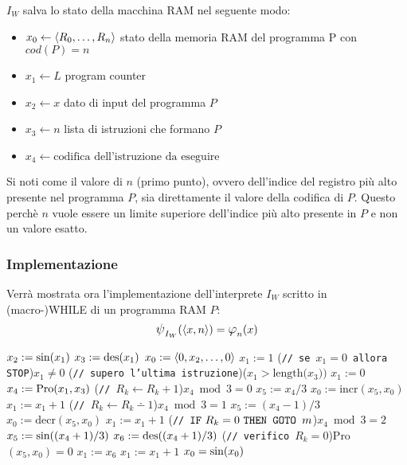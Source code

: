 $I_W$ salva lo stato della macchina RAM nel seguente modo:
\begin{itemize}
    \item $x_0 \leftarrow \langle R_0,\dots,R_{n}\rangle$\hfill
        stato della memoria RAM del programma P con $cod(P)=n$
    \item $x_1 \leftarrow L$ \hfill program counter
    \item $x_2 \leftarrow x$ \hfill dato di input del programma $P$
    \item $x_3 \leftarrow n$ \hfill lista di istruzioni che formano $P$
    \item $x_4 \leftarrow \text{codifica dell'istruzione da eseguire}$
\end{itemize}

Si noti come il valore di $n$ (primo punto), ovvero dell'indice del registro più alto 
presente nel programma $P$, sia direttamente il valore della codifica di $P$. Questo
perchè $n$ vuole essere un limite superiore dell'indice più alto presente in $P$ e non
un valore esatto.

\subsubsection*{Implementazione}
Verrà mostrata ora l'implementazione dell'interprete $I_W$ scritto in (macro-)WHILE di un
programma RAM $P$:
$$ \semWHILE_{I_W}(\cantor{x,n})=\semRAM_n(x) $$
\begin{tcolorbox}[colback=white,sharp corners,boxrule=.3mm]
\begin{algorithm}[H]
    \SetAlgoNoEnd
    $x_2 := \text{sin}(x_1)$\;
    $x_3 := \text{des}(x_1)$\;
    $x_0 := \langle0,x_2,\dots,0\rangle$\;
    $x_1 := 1$\;
    \While(\hfill\texttt{// se $x_1=0$ allora STOP}){$x_1\neq 0$}{
        \eIf(\hfill\texttt{// supero l'ultima istruzione}){($x_1>\text{length($x_3$))}$}{
            $x_1:=0$
        }{
            $x_4 := \text{Pro}(x_1,x_3)$
            \If(\hfill\texttt{// }$R_k\leftarrow R_k+1$){$x_4\bmod{3}=0$}{
                $x_5 := x_4 / 3$
                $x_0 := \text{incr}(x_5,x_0)$\;
                $x_1 := x_1+1$\;
            }
            \If(\hfill\texttt{// }$R_k\leftarrow R_k\dotminus1$){$x_4\bmod{3}=1$}{
                $x_5 := (x_4-1) / 3$
                $x_0 := \text{decr}(x_5,x_0)$\;
                $x_1 := x_1+1$\;
            }
            \If(\hfill\texttt{// }$\texttt{IF}\text{ $R_k=0$ }\texttt{THEN GOTO }\text{$m$}$){$x_4\bmod{3}=2$}{
                $x_5 := \text{sin}((x_4+1)/3)$
                $x_6 := \text{des}((x_4+1)/3)$
                \eIf(\hfill\texttt{// verifico }$R_k=0$){Pro$(x_5,x_0)=0$}{
                    $x_1:=x_6$\;
                }{
                    $x_1:=x_1+1$\;
                }
            }
        }
    }
    $x_0 = \text{sin}(x_0)$
\end{algorithm}
\end{tcolorbox}

